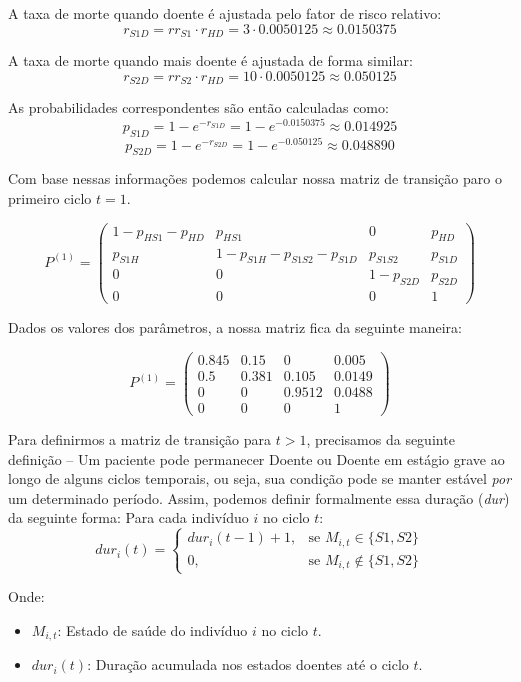 \documentclass[12pt, a4paper, openany]{book}
\numberwithin{equation}{chapter}
\numberwithin{table}{chapter}
\numberwithin{figure}{chapter}
\theoremstyle{break}
\begin{document}
A taxa de morte quando doente é ajustada pelo fator de risco relativo:
\[
r_{S1D} = rr_{S1} \cdot r_{HD} = 3 \cdot 0.0050125 \approx 0.0150375
\]

A taxa de morte quando mais doente é ajustada de forma similar:
\[
r_{S2D} = rr_{S2} \cdot r_{HD} = 10 \cdot 0.0050125 \approx 0.050125
\]

As probabilidades correspondentes são então calculadas como:
\[
p_{S1D} = 1 - e^{-r_{S1D}} = 1 - e^{-0.0150375} \approx 0.014925
\]
\[
p_{S2D} = 1 - e^{-r_{S2D}} = 1 - e^{-0.050125} \approx 0.048890
\]



Com base nessas informações podemos calcular nossa matriz de transição paro o primeiro ciclo $t = 1$.



\[
P^{(1)} =
\begin{pmatrix}
1 - p_{HS1} - p_{HD} & p_{HS1} & 0 & p_{HD} \\
p_{S1H} & 1 - p_{S1H} - p_{S1S2} - p_{S1D} & p_{S1S2} & p_{S1D} \\
0 & 0 & 1 - p_{S2D} & p_{S2D} \\
0 & 0 & 0 & 1
\end{pmatrix}
\]


Dados os valores dos parâmetros, a nossa matriz fica da seguinte maneira:


\[
P^{(1)} = \begin{pmatrix}
0.845 & 0.15 & 0 & 0.005 \\
0.5 & 0.381 & 0.105 & 0.0149 \\
0 & 0 & 0.9512 & 0.0488 \\
0 & 0 & 0 & 1
\end{pmatrix}
\]


Para definirmos a matriz de transição para $t>1$, precisamos da seguinte definição --  Um paciente pode permanecer Doente ou Doente em estágio grave ao longo de alguns ciclos temporais, ou seja, sua condição pode se manter estável \emph{por} um determinado período. Assim, podemos definir formalmente essa duração (\emph{dur}) da seguinte forma: 
Para cada indivíduo \( i \) no ciclo \( t \):
\[
dur_i(t) =
\begin{cases}
    dur_i(t-1) + 1, & \text{se } M_{i,t} \in \{S1, S2\} \\
    0, & \text{se } M_{i,t} \notin \{S1, S2\}
\end{cases}
\]

Onde:
\begin{itemize}
    \item \( M_{i,t} \): Estado de saúde do indivíduo \( i \) no ciclo \( t \).
    \item \( dur_i(t) \): Duração acumulada nos estados doentes até o ciclo \( t \).
\end{itemize}
\end{document}
